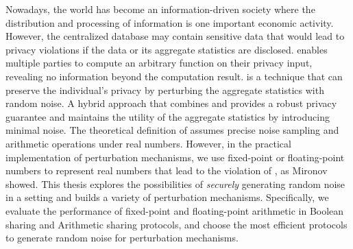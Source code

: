 Nowadays, the world has become an information-driven society where the distribution and processing of information is one important economic activity.
However, the centralized database may contain sensitive data that would lead to privacy violations if the data or its aggregate statistics are disclosed.
\smpc enables multiple parties to compute an arbitrary function on their privacy input, revealing no information beyond the computation result.
\differentialprivacy is a technique that can preserve the individual's privacy by perturbing the aggregate statistics with random noise.
A hybrid approach that combines \smpc and \differentialprivacy provides a robust privacy guarantee and maintains the utility of the aggregate statistics by introducing minimal noise.
The theoretical definition of \differentialprivacy assumes precise noise sampling and arithmetic operations under real numbers. However, in the practical implementation of perturbation mechanisms, we use fixed-point or floating-point numbers to represent real numbers that lead to the violation of \differentialprivacy, as Mironov~\cite{mironov2012significance} showed.
This thesis explores the possibilities of \textit{securely} generating random noise in a \smpc setting and builds a variety of perturbation mechanisms. Specifically, we evaluate the performance of fixed-point and floating-point arithmetic in Boolean sharing and Arithmetic sharing protocols, and choose the most efficient \smpc protocols to generate random noise for perturbation mechanisms. 











